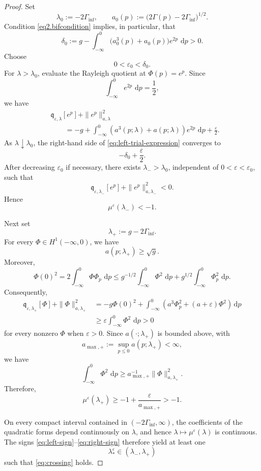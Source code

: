 \documentclass[11pt,reqno]{amsart}
\numberwithin{equation}{section}
\newcommand{\dd}{\,\mathrm{d}}
\theoremstyle{definition}
\theoremstyle{remark}
\begin{document}
\begin{proof}
Set
\[
\lambda_0:=-2\Gamma_{\inf},
\qquad
a_0(p):=
\bigl(2\Gamma(p)-2\Gamma_{\inf}\bigr)^{1/2}.
\]
Condition \eqref{eq2.bifcondition} implies, in particular, that
\[
\delta_0
:=
g-
\int_{-\infty}^{0}
\bigl(a_0^3(p)+a_0(p)\bigr)e^{2p}\,\dd p
>0.
\]
Choose
\[
0<\varepsilon_0<\delta_0.
\]
For $\lambda>\lambda_0$, evaluate the Rayleigh quotient at
$\Phi(p)=e^p$.  Since
\[
\int_{-\infty}^{0}e^{2p}\,\dd p=\frac12,
\]
we have
\begin{align}
&\mathfrak q_{\varepsilon,\lambda}[e^p]
+\|e^p\|_{a,\lambda}^2
\nonumber\\
&\qquad=
-g+
\int_{-\infty}^{0}
\left(
a^3(p;\lambda)+a(p;\lambda)
\right)e^{2p}\,\dd p
+\frac{\varepsilon}{2}.
\label{eq:left-trial-expression}
\end{align}
As $\lambda\downarrow\lambda_0$, the right-hand side of
\eqref{eq:left-trial-expression} converges to
\[
-\delta_0+\frac{\varepsilon}{2}.
\]
After decreasing $\varepsilon_0$ if necessary, there exists
$\lambda_->\lambda_0$, independent of
$0<\varepsilon<\varepsilon_0$, such that
\[
\mathfrak q_{\varepsilon,\lambda_-}[e^p]
+\|e^p\|_{a,\lambda_-}^2<0.
\]
Hence
\begin{equation}
\label{eq:left-sign}
\mu^\varepsilon(\lambda_-)<-1.
\end{equation}

Next set
\[
\lambda_+:=g-2\Gamma_{\inf}.
\]
For every $\Phi\in H^1(-\infty,0)$, we have
\[
a(p;\lambda_+)\geq\sqrt g.
\]
Moreover,
\[
\Phi(0)^2
=
2\int_{-\infty}^{0}\Phi\Phi_p\,\dd p
\leq
g^{-1/2}\int_{-\infty}^{0}\Phi^2\,\dd p
+
g^{1/2}\int_{-\infty}^{0}\Phi_p^2\,\dd p.
\]
Consequently,
\begin{align*}
\mathfrak q_{\varepsilon,\lambda_+}[\Phi]
+\|\Phi\|_{a,\lambda_+}^2
&=
-g\Phi(0)^2
+
\int_{-\infty}^{0}
\left(
a^3\Phi_p^2+(a+\varepsilon)\Phi^2
\right)\dd p\\
&\geq
\varepsilon\int_{-\infty}^{0}\Phi^2\,\dd p>0
\end{align*}
for every nonzero $\Phi$ when $\varepsilon>0$.  Since
$a(\cdot;\lambda_+)$ is bounded above, with
\[
 a_{\max,+}:=\sup_{p\leq0}a(p;\lambda_+)<\infty,
\]
we have
\[
 \int_{-\infty}^0\Phi^2\,\dd p
 \geq a_{\max,+}^{-1}\|\Phi\|_{a,\lambda_+}^2.
\]
Therefore,
\begin{equation}
\label{eq:right-sign}
\mu^\varepsilon(\lambda_+)
\geq-1+\frac{\varepsilon}{a_{\max,+}}>-1.
\end{equation}

On every compact interval contained in
$(-2\Gamma_{\inf},\infty)$, the coefficients of the quadratic forms
depend continuously on $\lambda$, and hence
$\lambda\mapsto\mu^\varepsilon(\lambda)$ is continuous.  The signs
\eqref{eq:left-sign}--\eqref{eq:right-sign} therefore yield at least
one
\[
\lambda_*^\varepsilon\in(\lambda_-,\lambda_+)
\]
such that \eqref{eq:crossing} holds.


\end{proof}
\end{document}
